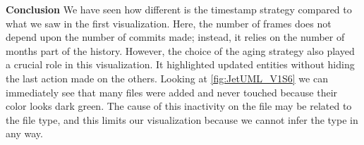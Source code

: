 \textbf{Conclusion}
We have seen how different is the timestamp strategy compared to what we saw in the first visualization. Here, the number of frames does not depend upon the number of commits made; instead, it relies on the number of months part of the history. 
However, the choice of the aging strategy also played a crucial role in this visualization. It highlighted updated entities without hiding the last action made on the others. Looking at \autoref{fig:JetUML_V1S6} we can immediately see that many files were added and never touched because their color looks dark green. The cause of this inactivity on the file may be related to the file type, and this limits our visualization because we cannot infer the type in any way. 




